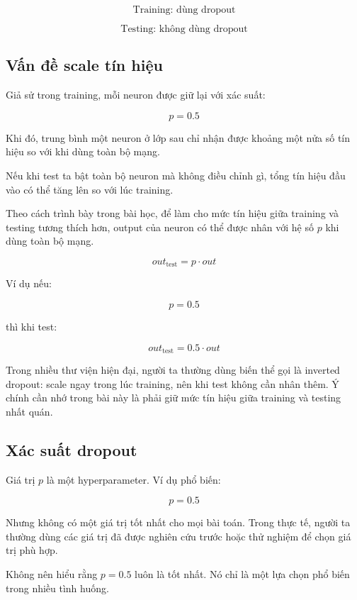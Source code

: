 \[
    \text{Training: dùng dropout}
\]

\[
    \text{Testing: không dùng dropout}
\]

\subsection{Vấn đề scale tín hiệu}

Giả sử trong training, mỗi neuron được giữ lại với xác suất:

\[
    p=0.5
\]

Khi đó, trung bình một neuron ở lớp sau chỉ nhận được khoảng một nửa số tín hiệu so với khi dùng toàn bộ mạng.

Nếu khi test ta bật toàn bộ neuron mà không điều chỉnh gì, tổng tín hiệu đầu vào có thể tăng lên so với lúc training.

Theo cách trình bày trong bài học, để làm cho mức tín hiệu giữa training và testing tương thích hơn, output của neuron có thể được nhân với hệ số $p$ khi dùng toàn bộ mạng.

\[
    out_{\text{test}} = p \cdot out
\]

Ví dụ nếu:

\[
    p=0.5
\]

thì khi test:

\[
    out_{\text{test}}=0.5\cdot out
\]

\begin{luuy}
Trong nhiều thư viện hiện đại, người ta thường dùng biến thể gọi là inverted dropout: scale ngay trong lúc training, nên khi test không cần nhân thêm. Ý chính cần nhớ trong bài này là phải giữ mức tín hiệu giữa training và testing nhất quán.
\end{luuy}

\subsection{Xác suất dropout}

Giá trị $p$ là một hyperparameter. Ví dụ phổ biến:

\[
    p=0.5
\]

Nhưng không có một giá trị tốt nhất cho mọi bài toán. Trong thực tế, người ta thường dùng các giá trị đã được nghiên cứu trước hoặc thử nghiệm để chọn giá trị phù hợp.

\begin{luuy}
Không nên hiểu rằng $p=0.5$ luôn là tốt nhất. Nó chỉ là một lựa chọn phổ biến trong nhiều tình huống.
\end{luuy}

